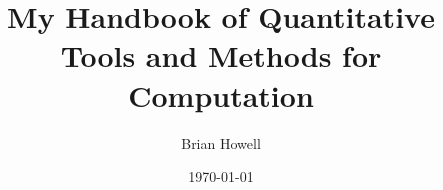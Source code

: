 \documentclass{article}
\title{My Handbook of Quantitative Tools and Methods for Computation}
\author{Brian Howell}
\date{\today}
\begin{document}
\createintro










\listnotes
\end{document}
